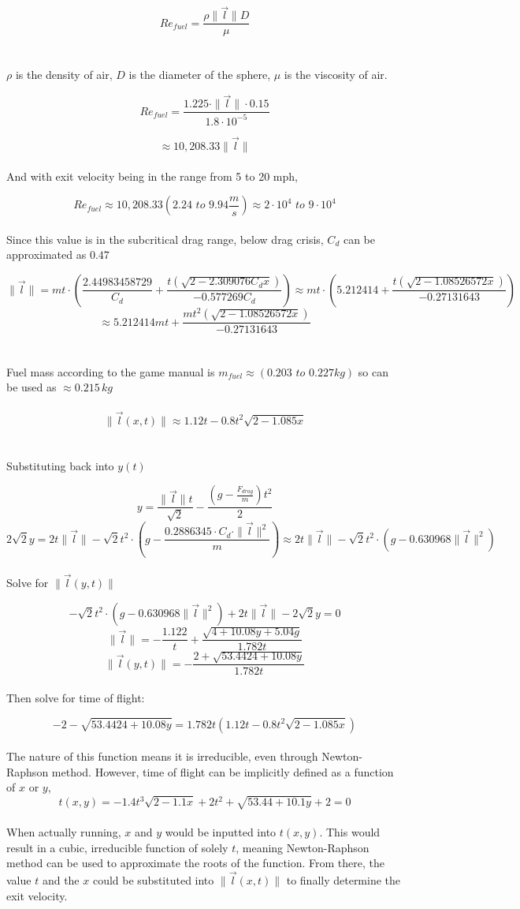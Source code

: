 \documentclass{article}
\begin{document}
\[Re_{fuel} = \frac{\rho\|\vec{l}\|D}{\mu}\]
\\\\
$\rho$ is the density of air, $D$ is the diameter of the sphere, $\mu$ is the viscosity of air.

\[Re_{fuel} = \frac{1.225 \cdot \|\vec{l}\| \cdot 0.15}{1.8 \cdot 10^{-5}}\]

\[\approx 10,208.33\|\vec{l}\|\]
\\
And with exit velocity being in the range from 5 to 20 mph,

\[Re_{fuel} \approx 10,208.33(2.24 \,\, to \,\, 9.94 \frac{m}{s}) \approx 2 \cdot 10^4 \,\, to \,\, 9 \cdot 10^4\]
\\
Since this value is in the subcritical drag range, below drag crisis, $C_d$ can be approximated as $0.47$

\[\|\vec{l}\| = mt \cdot (\frac{2.44983458729}{C_d} + \frac{t(\sqrt{2 - 2.309076C_dx})}{-0.577269C_d}) \approx mt \cdot (5.212414 + \frac{t(\sqrt{2-1.08526572x})}{-0.27131643})\]
\[\approx 5.212414mt +\frac{mt^2(\sqrt{2-1.08526572x})}{-0.27131643}\]
\\\\
Fuel mass according to the game manual is $m_{fuel} \approx (0.203 \,\, to \,\, 0.227kg)$ so can be used as $\approx 0.215 \,kg$
\\\\
\[\boxed{\|\vec{l}(x,t)\| \approx 1.12t - 0.8t^2\sqrt{2-1.085x}}\]
\\\\
Substituting back into $y(t)$

\[ y = \frac{\|\vec{l}\|t}{\sqrt{2}} - \frac{(g-\frac{F_{drag}}{m})t^2}{2}\]
\[2 \sqrt{2}y = 2t\|\vec{l}\| - \sqrt{2}t^2\cdot(g-\frac{0.2886345 \cdot C_d \cdot \|\vec{l}\|^2}{m}) \approx 2t\|\vec{l}\| -\sqrt{2}t^2 \cdot (g-0.630968\|\vec{l}\|^2)\]
\\
Solve for $\|\vec{l}(y,t)\|$

\[-\sqrt{2}t^2 \cdot (g-0.630968\|\vec{l}\|^2) + 2t\|\vec{l}\| - 2 \sqrt{2}y = 0\]
\[\|\vec{l}\| = -\frac{1.122}{t} + \frac{\sqrt{4 + 10.08y + 5.04g}}{1.782t}\]
\[\boxed{\|\vec{l}(y,t)\| = -\frac{2 + \sqrt{53.4424 + 10.08y}}{1.782t}}\]
\\
Then solve for time of flight:

\[-2 - \sqrt{53.4424 + 10.08y} = 1.782t(1.12t - 0.8t^2\sqrt{2-1.085x})\]
\\
The nature of this function means it is irreducible, even through Newton-Raphson method. However, time of flight can be implicitly defined as a function of $x$ or $y$,
\[\boxed{t(x,y) = -1.4t^3\sqrt{2-1.1x} + 2t^2 + \sqrt{53.44 + 10.1y} + 2 = 0}\]
\\
When actually running, $x$ and $y$ would be inputted into $t(x,y)$. This would result in a cubic, irreducible function of solely $t$, meaning Newton-Raphson method can be used to approximate the roots of the function.
From there, the value $t$ and the $x$ could be substituted into $\|\vec{l}(x,t)\|$ to finally determine the exit velocity. 
\end{document}
